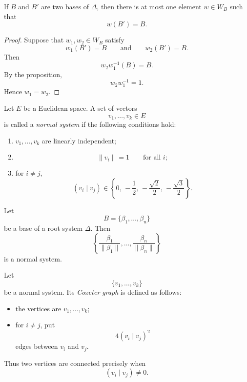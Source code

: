 \begin{corollary}
    If \(B\) and \(B'\) are two bases of \(\Delta\), then there is at most one
    element \(w\in W_B\) such that
    \[
        w(B')=B.
    \]
\end{corollary}

\begin{proof}
    Suppose that \(w_1,w_2\in W_B\) satisfy
    \[
        w_1(B')=B
        \qquad\text{and}\qquad
        w_2(B')=B.
    \]
    Then
    \[
        w_2w_1^{-1}(B)=B.
    \]
    By the proposition,
    \[
        w_2w_1^{-1}=1.
    \]
    Hence \(w_1=w_2\).
\end{proof}

\begin{definition}
    Let \(E\) be a Euclidean space. A set of vectors
    \[
        v_1,\dots,v_k\in E
    \]
    is called a \emph{normal system} if the following conditions hold:
    \begin{enumerate}
        \item \(v_1,\dots,v_k\) are linearly independent;

        \item
              \[
                  \|v_i\|=1
                  \qquad\text{for all } i;
              \]

        \item for \(i\neq j\),
              \[
                  (v_i\mid v_j)
                  \in
                  \left\{
                  0,\,
                  -\frac{1}{2},\,
                  -\frac{\sqrt{2}}{2},\,
                  -\frac{\sqrt{3}}{2}
                  \right\}.
              \]
    \end{enumerate}
\end{definition}

\begin{example}
    Let
    \[
        B=\{\beta_1,\dots,\beta_n\}
    \]
    be a base of a root system \(\Delta\). Then
    \[
        \left\{
        \frac{\beta_1}{\|\beta_1\|},
        \dots,
        \frac{\beta_n}{\|\beta_n\|}
        \right\}
    \]
    is a normal system.
\end{example}

\begin{definition}
    Let
    \[
        \{v_1,\dots,v_k\}
    \]
    be a normal system. Its \emph{Coxeter graph} is defined as follows:
    \begin{itemize}
        \item the vertices are \(v_1,\dots,v_k\);
        \item for \(i\neq j\), put
              \[
                  4(v_i\mid v_j)^2
              \]
              edges between \(v_i\) and \(v_j\).
    \end{itemize}
    Thus two vertices are connected precisely when
    \[
        (v_i\mid v_j)\neq 0.
    \]
\end{definition}

